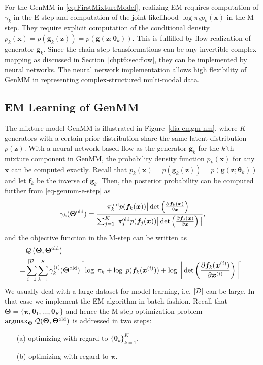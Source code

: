 For the GenMM in \eqref{eq:FirstMixtureModel}, realizing EM requires computation of $\gamma_k$ in the E-step and computation of the joint likelihood $\log{\pi_k p_k(\bm{x})}$ in the M-step. They require explicit computation of the conditional density $p_k(\bm{x}) =  p(\bm{g}_k(\bm{z})) =p(\bm{g}(\bm{z};\bm{\theta}_k))$. This is fulfilled by flow realization of generator $\bm{g}_k$. Since the chain-step transformations can be any invertible complex mapping as discussed in Section~\ref{chpt6:sec:flow}, they can be implemented by neural networks. The neural network implementation allows high flexibility of GenMM in representing complex-structured multi-modal data.

\subsection{EM Learning of GenMM}
\label{sec-algo-genmm}
The mixture model GenMM is illustrated in Figure~\ref{dia-emgm-nm},
where $K$ generators with a certain prior distribution share the same
latent distribution $p(\bm{z})$. With a neural network based flow as the generator $\bm{g}_k$ for the $k$'th mixture component in GenMM, the probability density function $p_k(\bm{x})$ for any
$\bm{x}$ can be computed exactly. Recall that $p_k(\bm{x}) =  p(\bm{g}_k(\bm{z})) =p(\bm{g}(\bm{z};\bm{\theta}_k))$ and let $\bm{f}_k$ be the inverse of $\bm{g}_k$. Then, the posterior probability can be computed further from \eqref{eq-genmm-e-step} as
\begin{align}\label{eq-genmm-gamma}
  \gamma_k({\bm{\Theta}}^{\mathrm{old}}) = \frac{\pi_k^{\mathrm{old}} p(\bm{f}_k(\bm{x})) \big|\det\left( \frac{ \partial \bm{f}_k(\bm{x})}{\partial \bm{x}} \right)\big|}{\sum_{j=1}^K\; \pi_j^{\mathrm{old}} p(\bm{f}_j(\bm{x})) \big|\det\left( \frac{ \partial \bm{f}_j(\bm{x})}{\partial \bm{x}} \right)\big|},
\end{align}
and the objective function in the M-step can be written as
\begin{align}\label{eq-genmm-obj}
  &\mathcal{Q}\left(\bm{\Theta},\bm{\Theta}^{\mathrm{old}}\right)  \nonumber\\
  =&\sum_{i=1}^{| \mathcal{D} |} \sum_{k=1}^{K}\gamma_k^{(i)}(\bm{\Theta}^{\mathrm{old}})\bigg[ \log\;\pi_k +\log\;p(\bm{f}_k(\bm{x}^{(i)})) + \log\;\bigg|\det\left(\frac{ \partial \bm{f}_k(\bm{x}^{(i)})}{\partial \bm{x}^{(i)}} \right)\bigg|\bigg].
\end{align}
We usually deal with a large dataset for model learning, i.e. $| \mathcal{D} |$ can be large. In that case we implement the EM algorithm in batch fashion. 
Recall that $ \bm{\Theta}= \{\bm{\pi},\bm{\theta}_1, \dots, \bm{\theta}_K \}$ and hence the M-step optimization problem $\operatorname{argmax}_{\bm{\Theta}} \mathcal{Q} (\bm{\Theta},\bm{\Theta}^{\mathrm{old}})$ is addressed in two steps:
\begin{itemize}
\item[(a)] optimizing with regard to $\{ \bm{\theta}_k \}_{k=1}^{K}$,
\item[(b)] optimizing with regard to $\bm{\pi}$.
\end{itemize}

